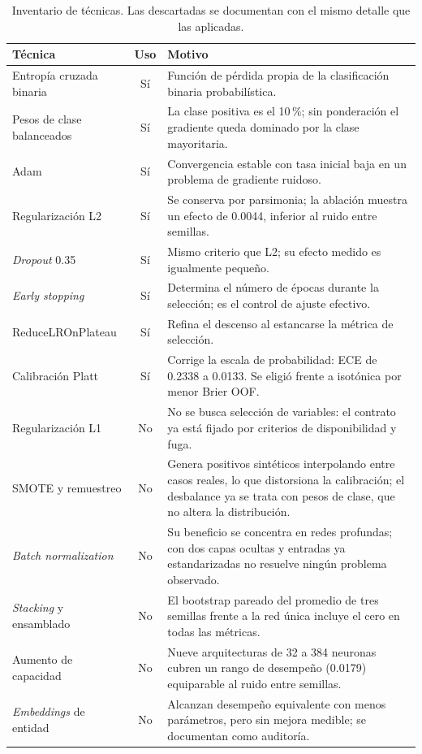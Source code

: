 \begin{table}[tbp]\centering\small
\caption{Inventario de técnicas. Las descartadas se documentan con el mismo detalle que las aplicadas.}
\label{tab:tecnicas}
\begin{tabularx}{\textwidth}{@{}p{3.6cm}c X@{}}\toprule
Técnica & Uso & Motivo \\\midrule
Entropía cruzada binaria & Sí & Función de pérdida propia de la clasificación binaria probabilística. \\
Pesos de clase balanceados & Sí & La clase positiva es el 10\,\%; sin ponderación el gradiente queda dominado por la clase mayoritaria. \\
Adam & Sí & Convergencia estable con tasa inicial baja en un problema de gradiente ruidoso. \\
Regularización L2 & Sí & Se conserva por parsimonia; la ablación muestra un efecto de 0.0044, inferior al ruido entre semillas. \\
\emph{Dropout} 0.35 & Sí & Mismo criterio que L2; su efecto medido es igualmente pequeño. \\
\emph{Early stopping} & Sí & Determina el número de épocas durante la selección; es el control de ajuste efectivo. \\
ReduceLROnPlateau & Sí & Refina el descenso al estancarse la métrica de selección. \\
Calibración Platt & Sí & Corrige la escala de probabilidad: ECE de 0.2338 a 0.0133. Se eligió frente a isotónica por menor Brier OOF. \\\midrule
Regularización L1 & No & No se busca selección de variables: el contrato ya está fijado por criterios de disponibilidad y fuga. \\
SMOTE y remuestreo \cite{chawla_smote_2002} & No & Genera positivos sintéticos interpolando entre casos reales, lo que distorsiona la calibración; el desbalance ya se trata con pesos de clase, que no altera la distribución. \\
\emph{Batch normalization} & No & Su beneficio se concentra en redes profundas; con dos capas ocultas y entradas ya estandarizadas no resuelve ningún problema observado. \\
\emph{Stacking} y ensamblado & No & El bootstrap pareado del promedio de tres semillas frente a la red única incluye el cero en todas las métricas. \\
Aumento de capacidad & No & Nueve arquitecturas de 32 a 384 neuronas cubren un rango de desempeño (0.0179) equiparable al ruido entre semillas. \\
\emph{Embeddings} de entidad & No & Alcanzan desempeño equivalente con menos parámetros, pero sin mejora medible; se documentan como auditoría. \\\bottomrule
\end{tabularx}
\end{table}

